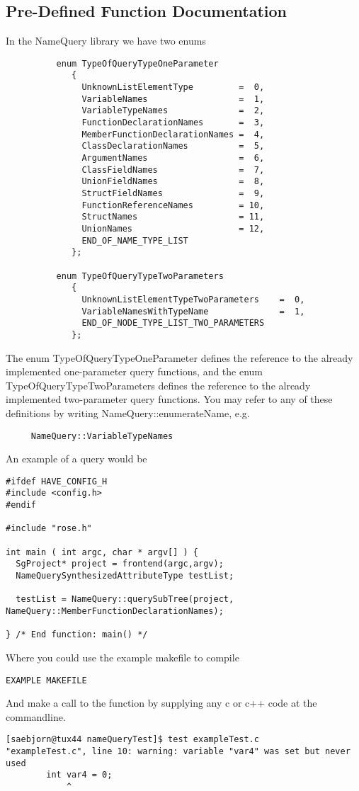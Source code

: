 {\subsection{Pre-Defined Function Documentation}
\label{FunctionDocumentation}

In the NameQuery library we have two enums
\begin{verbatim}
          enum TypeOfQueryTypeOneParameter
             {
               UnknownListElementType         =  0,
               VariableNames                  =  1,
               VariableTypeNames              =  2,
               FunctionDeclarationNames       =  3,
               MemberFunctionDeclarationNames =  4,
               ClassDeclarationNames          =  5,
               ArgumentNames                  =  6,
               ClassFieldNames                =  7,
               UnionFieldNames                =  8,
               StructFieldNames               =  9,
               FunctionReferenceNames         = 10,
               StructNames                    = 11,
               UnionNames                     = 12,
               END_OF_NAME_TYPE_LIST
             };
	 
          enum TypeOfQueryTypeTwoParameters
             {
               UnknownListElementTypeTwoParameters    =  0,
               VariableNamesWithTypeName              =  1,
               END_OF_NODE_TYPE_LIST_TWO_PARAMETERS
             };
\end{verbatim}
The enum TypeOfQueryTypeOneParameter defines the reference to the
already implemented one-parameter query functions, and the enum 
TypeOfQueryTypeTwoParameters defines the reference to the already
implemented two-parameter query functions. You may refer to any of
these definitions by writing NameQuery::enumerateName, e.g.
\begin{verbatim}
     NameQuery::VariableTypeNames
\end{verbatim}
An example of a query would be 
\begin{verbatim}
#ifdef HAVE_CONFIG_H
#include <config.h>
#endif

#include "rose.h"

int main ( int argc, char * argv[] ) {
  SgProject* project = frontend(argc,argv);
  NameQuerySynthesizedAttributeType testList;
  
  testList = NameQuery::querySubTree(project, NameQuery::MemberFunctionDeclarationNames);

} /* End function: main() */
\end{verbatim}
Where you could use the example makefile to compile
\begin{verbatim}
EXAMPLE MAKEFILE
\end{verbatim}
And make a call to the function by supplying any c or c++ code at the commandline.
\begin{verbatim}
[saebjorn@tux44 nameQueryTest]$ test exampleTest.c
"exampleTest.c", line 10: warning: variable "var4" was set but never used
        int var4 = 0;
            ^


\end{verbatim}}
